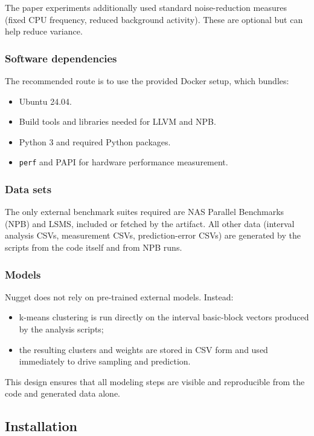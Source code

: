 The paper experiments additionally used standard noise-reduction measures (fixed CPU frequency, reduced background activity). These are optional but can help reduce variance.

\subsubsection{Software dependencies}

The recommended route is to use the provided Docker setup, which bundles:
\begin{itemize}
  \item Ubuntu 24.04.
  \item Build tools and libraries needed for LLVM and NPB.
  \item Python 3 and required Python packages.
  \item \texttt{perf} and PAPI for hardware performance measurement.
\end{itemize}

\subsubsection{Data sets}

The only external benchmark suites required are NAS Parallel Benchmarks (NPB) and LSMS, included or fetched by the artifact. All other data (interval analysis CSVs, measurement CSVs, prediction-error CSVs) are generated by the scripts from the code itself and from NPB runs.

\subsubsection{Models}

Nugget does not rely on pre-trained external models. Instead:
\begin{itemize}
  \item k-means clustering is run directly on the interval basic-block vectors produced by the analysis scripts;
  \item the resulting clusters and weights are stored in CSV form and used immediately to drive sampling and prediction.
\end{itemize}
This design ensures that all modeling steps are visible and reproducible from the code and generated data alone.

\subsection{Installation}

